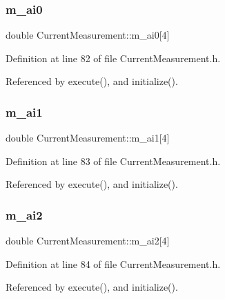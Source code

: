 \subsubsection{\texorpdfstring{m\+\_\+ai0}{m\_ai0}}
{\footnotesize\ttfamily double Current\+Measurement\+::m\+\_\+ai0\mbox{[}4\mbox{]}\hspace{0.3cm}{\ttfamily [private]}}



Definition at line 82 of file Current\+Measurement.\+h.



Referenced by execute(), and initialize().

\mbox{\label{classCurrentMeasurement_aeef18708be94b89de9c4384dd452207d}} 
\subsubsection{\texorpdfstring{m\+\_\+ai1}{m\_ai1}}
{\footnotesize\ttfamily double Current\+Measurement\+::m\+\_\+ai1\mbox{[}4\mbox{]}\hspace{0.3cm}{\ttfamily [private]}}



Definition at line 83 of file Current\+Measurement.\+h.



Referenced by execute(), and initialize().

\mbox{\label{classCurrentMeasurement_a27ce0cfd8d1c04f6cd4d8de0403fafba}} 
\subsubsection{\texorpdfstring{m\+\_\+ai2}{m\_ai2}}
{\footnotesize\ttfamily double Current\+Measurement\+::m\+\_\+ai2\mbox{[}4\mbox{]}\hspace{0.3cm}{\ttfamily [private]}}



Definition at line 84 of file Current\+Measurement.\+h.



Referenced by execute(), and initialize().

